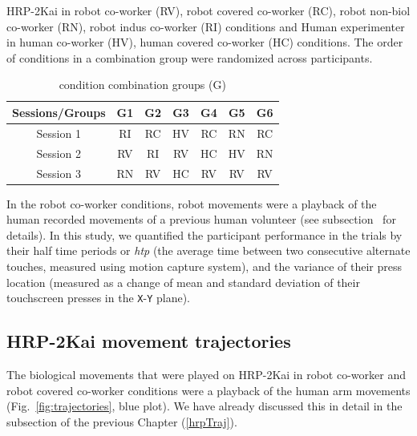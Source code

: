 \begin{table}[hpt]
	\caption{condition combination groups (G)}
	{HRP-2Kai in robot co-worker (RV), robot covered co-worker (RC), robot non-biol co-worker (RN), robot indus co-worker (RI) conditions and Human experimenter in human co-worker (HV), human covered co-worker (HC) conditions. The order of conditions in a combination group were randomized across participants.}
	\label{groupTable}
	\begin{center}
		\begin{tabular}{|c cccccc|}
			\hline  
			{\bf Sessions/Groups} &  {\bf G1} &  {\bf G2} &  {\bf G3} &  {\bf G4} &  {\bf G5} &  {\bf G6}  \\ 
			\hline
			Session 1 & RI & RC & HV & RC & RN &  RC \\ 
			
			Session 2 & RV & RI & RV & HC & HV &  RN \\ 
			
			Session 3 & RN & RV & HC & RV & RV &  RV \\ 
			\hline 			
		\end{tabular} 
	\end{center}
\end{table}


In the robot co-worker conditions, robot movements were a playback of the human recorded movements of a previous human volunteer (see subsection~ for details). In this study, we quantified the participant performance in the trials by their half time periods or {\it htp} (the average time between two consecutive alternate touches, measured using motion capture system), and the variance of their press location (measured as a change of mean and standard deviation of their touchscreen presses in the \texttt{X}-\texttt{Y} plane).

\subsection{HRP-2Kai movement trajectories} \label{HRP2_Traj}

The biological movements that were played on HRP-2Kai in robot co-worker and robot covered co-worker conditions were a playback of the human arm movements (Fig.~\ref{fig:trajectories}, blue plot). We have already discussed this in detail in the subsection of the previous Chapter (\ref{hrpTraj}).

